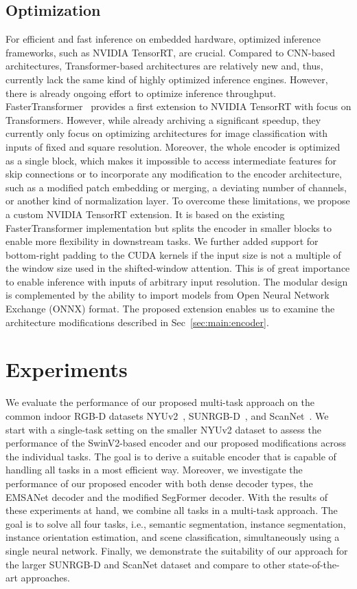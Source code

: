 \documentclass[conference]{IEEEtran}
\begin{document}
\subsection{Optimization}
\label{sec:main:optimization}
For efficient and fast inference on embedded hardware, optimized inference frameworks, such as NVIDIA TensorRT, are crucial.
Compared to CNN-based architectures, Transformer-based architectures are relatively new and, thus, currently lack the same kind of highly optimized inference engines. 
However, there is already ongoing effort to optimize inference throughput.
FasterTransformer~\cite{fastertransformer} provides a first extension to NVIDIA TensorRT with focus on Transformers.
However, while already archiving a significant speedup, they currently only focus on optimizing architectures for image classification with inputs of fixed and square resolution.
Moreover, the whole encoder is optimized as a single block, which makes it impossible to access intermediate features for skip connections or to incorporate any modification to the encoder architecture, such as a modified patch embedding or merging, a deviating number of channels, or another kind of normalization layer.
To overcome these limitations, we propose a custom NVIDIA TensorRT extension. 
It is based on the existing FasterTransformer implementation but splits the encoder in smaller blocks to enable more flexibility in downstream tasks. 
We further added support for bottom-right padding to the CUDA kernels if the input size is not a multiple of the window size used in the shifted-window attention. 
This is of great importance to enable inference with inputs of arbitrary input resolution.
The modular design is complemented by the ability to import models from Open Neural Network Exchange (ONNX) format.
The proposed extension enables us to examine the architecture modifications described in Sec~\ref{sec:main:encoder}.
 \section{Experiments}
\label{sec:experiments}
We evaluate the performance of our proposed multi-task approach on the common indoor RGB-D datasets NYUv2~\cite{NYUv2-eccv2012}, SUNRGB-D~\cite{SUNRGBD-cvpr2015}, and ScanNet~\cite{scannet-cvpr2017}.
We start with a single-task setting on the smaller NYUv2 dataset to assess the performance of the SwinV2-based encoder and our proposed modifications across the individual tasks. 
The goal is to derive a suitable encoder that is capable of handling all tasks in a most efficient way.
Moreover, we investigate the performance of our proposed encoder with both dense decoder types, the EMSANet decoder and the modified SegFormer decoder. 
With the results of these experiments at hand, we combine all tasks in a multi-task approach.
The goal is to solve all four tasks, i.e., semantic segmentation, instance segmentation, instance orientation estimation, and scene classification, simultaneously using a single neural network.
Finally, we demonstrate the suitability of our approach for the larger SUNRGB-D and ScanNet dataset and compare to other state-of-the-art approaches.
\end{document}
